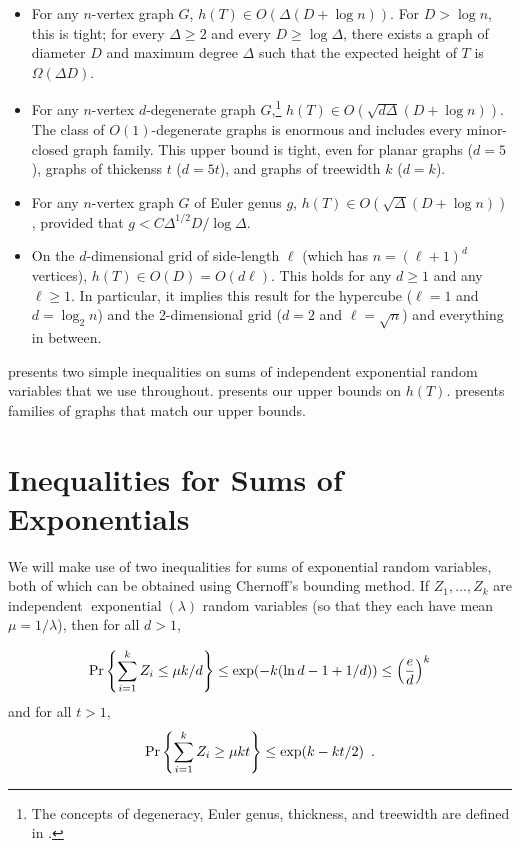 \documentclass[lotsofwhite]{patmorin}
\DeclareMathOperator{\exponential}{exponential}
\begin{document}
\begin{itemize}
  \item For any $n$-vertex graph $G$, $h(T)\in O(\Delta(D+\log n))$.
  For $D>\log n$, this is tight; for every $\Delta\ge 2$ and every $D \ge
  \log\Delta$, there exists a graph of diameter $D$ and maximum degree
  $\Delta$ such that the expected height of $T$ is $\Omega(\Delta D)$.

  \item For any $n$-vertex $d$-degenerate graph $G$,\footnote{The concepts
  of degeneracy, Euler genus, thickness, and treewidth are defined in
  .} $h(T)\in O(\sqrt{d\Delta}(D+\log n))$.
  The class of $O(1)$-degenerate graphs is enormous and includes every
  minor-closed graph family.  This upper bound is tight, even for
  planar graphs ($d=5$), graphs of thickenss $t$ ($d=5t$), and graphs
  of treewidth $k$ ($d=k$).

  \item For any $n$-vertex graph $G$ of Euler genus $g$,
  $h(T)\in O(\sqrt{\Delta}(D+\log n))$, provided that $g <
  C\Delta^{1/2}D/\log\Delta$.

  \item On the $d$-dimensional grid of side-length $\ell$ (which has
  $n=(\ell+1)^d$ vertices), $h(T)\in O(D)=O(d\ell)$. This holds for any $d\ge
  1$ and any $\ell\ge 1$.  In particular, it implies this result for the
  hypercube ($\ell=1$ and $d=\log_2 n$) and the 2-dimensional grid ($d=2$
  and $\ell=\sqrt{n}$) and everything in between.
\end{itemize}

 presents two simple inequalities on sums of
independent exponential random variables that we use throughout.
 presents our upper bounds on $h(T)$.
 presents families of graphs that match our upper
bounds.

\section{Inequalities for Sums of Exponentials}

We will make use of two inequalities for sums of exponential random
variables, both of which can be obtained using Chernoff's bounding
method.  If $Z_1,\ldots,Z_k$ are independent $\exponential(\lambda)$
random variables (so that they each have mean $\mu=1/\lambda$), then
for all $d>1$,

\begin{equation}
    \Pr\left\{\sum_{i=1}^k Z_i \le \mu k/d\right\} \le \exp(-k(\ln d -1 + 1/d)) \le \left(\frac{e}{d}\right)^k  \eqlabel{head-bound}
\end{equation}
and for all $t>1$, 
\begin{equation}
    \Pr\left\{\sum_{i=1}^k Z_i \ge \mu k t\right\} \le \exp (k-kt/2) \enspace . \eqlabel{tail-bound}
\end{equation}
\end{document}
